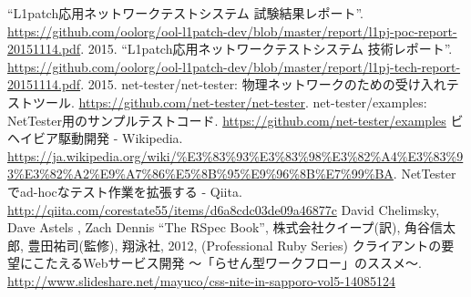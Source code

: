 
\begin{thebibliography}{99}
         ``L1patch応用ネットワークテストシステム 試験結果レポート''.
         \url{https://github.com/oolorg/ool-l1patch-dev/blob/master/report/l1pj-poc-report-20151114.pdf}.
         2015.
         ``L1patch応用ネットワークテストシステム 技術レポート''.
         \url{https://github.com/oolorg/ool-l1patch-dev/blob/master/report/l1pj-tech-report-20151114.pdf}.
         2015.
         net-tester/net-tester: 物理ネットワークのための受け入れテストツール.
         \url{https://github.com/net-tester/net-tester}.
         net-tester/examples: NetTester用のサンプルテストコード.
         \url{https://github.com/net-tester/examples}
         ビヘイビア駆動開発 - Wikipedia.
         \url{https://ja.wikipedia.org/wiki/%E3%83%93%E3%83%98%E3%82%A4%E3%83%93%E3%82%A2%E9%A7%86%E5%8B%95%E9%96%8B%E7%99%BA}.
         NetTesterでad-hocなテスト作業を拡張する - Qiita.
         \url{http://qiita.com/corestate55/items/d6a8cdc03de09a46877c}
  David Chelimsky, Dave Astels , Zach Dennis ``The
         RSpec Book'', 株式会社クイープ(訳), 角谷信太郎, 豊田祐司(監修),
         翔泳社, 2012, (Professional Ruby Series)
         クライアントの要望にこたえるWebサービス開発 ～「らせん型ワークフロー」のススメ～.
         \url{http://www.slideshare.net/mayuco/css-nite-in-sapporo-vol5-14085124}
\end{thebibliography}

